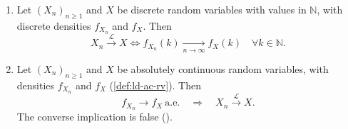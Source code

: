 \begin{theorem}\label{prop:cl-densities}
\leavevmode
\begin{enumerate}[label=(\arabic*)]
  \item Let $(X_n)_{n\ge1}$ and $X$ be discrete random variables with values in $\mathbb N$, with
    discrete densities $f_{X_n}$ and $f_X$. Then
    \[
      X_n\xrightarrow{\mathcal L}X\iff f_{X_n}(k)\xrightarrow[n\to\infty]{}f_X(k)\quad\forall k\in\mathbb N .
    \]
  \item Let $(X_n)_{n\ge1}$ and $X$ be absolutely continuous random variables, with densities
    $f_{X_n}$ and $f_X$ (\cref{def:ld-ac-rv}). Then
    \[
      f_{X_n}\to f_X\ \text{a.e.}\quad\Longrightarrow\quad X_n\xrightarrow{\mathcal L}X .
    \]
    The converse implication is false ().
\end{enumerate}
\end{theorem}

